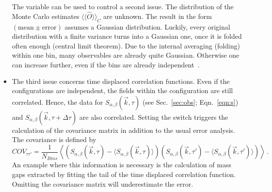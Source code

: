 \begin{itemize}
The  variable can be used to control a second issue. The distribution of the Monte Carlo estimates $\langle\langle\hat{O}\rangle\rangle_C$ are unknown. The result in the form $(\mathrm{mean}\pm \mathrm{error})$ assumes a Gaussian distribution. Luckily, every original distribution with a finite variance turns into a Gaussian one, once it is folded often enough (central limit theorem). Due to the internal averaging (folding) within one bin, many observables are already quite Gaussian. Otherwise one can increase  further, even if the bins are already independent~\cite{Bercx17}.
	\item The third issue concerns time displaced correlation functions. Even if the configurations are independent, the fields within the configuration are still correlated. Hence, the data for $S_{\alpha,\beta}(\vec{k},\tau)$ (see Sec.~\ref{sec:obs}; Eqn.~\ref{eqn:s}) and $S_{\alpha,\beta}(\vec{k},\tau+\Delta\tau)$ are also correlated. Setting the switch  triggers the calculation of the covariance matrix in addition to the usual error analysis. The covariance is defined by
	\begin{equation}
		COV_{\tau \tau'}=\frac{1}{N_{Bins}}\left\langle\left(S_{\alpha,\beta}(\vec{k},\tau)-\langle S_{\alpha,\beta}(\vec{k},\tau)\rangle\right)\left(S_{\alpha,\beta}(\vec{k},\tau')-\langle S_{\alpha,\beta}(\vec{k},\tau')\rangle\right)\right\rangle\,.
	\end{equation}
An example where this information is necessary is the  calculation of mass gaps extracted by fitting the  tail  of the time displaced correlation function.  Omitting  the covariance matrix will  underestimate the  error.
\end{itemize}
